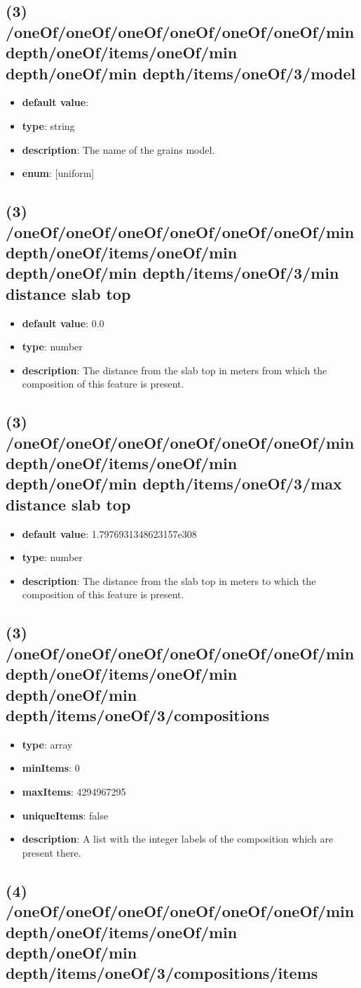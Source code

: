 \subsection{(3) /oneOf/oneOf/oneOf/oneOf/oneOf/oneOf/min depth/oneOf/items/oneOf/min depth/oneOf/min depth/items/oneOf/3/model}
\begin{itemize}[leftmargin=3em]\item {\bf default value}: 
\item {\bf type}: string
\item {\bf description}: The name of the grains model.
\item {\bf enum}: [uniform]\end{itemize}\subsection{(3) /oneOf/oneOf/oneOf/oneOf/oneOf/oneOf/min depth/oneOf/items/oneOf/min depth/oneOf/min depth/items/oneOf/3/min distance slab top}
\begin{itemize}[leftmargin=3em]\item {\bf default value}: 0.0
\item {\bf type}: number
\item {\bf description}: The distance from the slab top in meters from which the composition of this feature is present.
\end{itemize}\subsection{(3) /oneOf/oneOf/oneOf/oneOf/oneOf/oneOf/min depth/oneOf/items/oneOf/min depth/oneOf/min depth/items/oneOf/3/max distance slab top}
\begin{itemize}[leftmargin=3em]\item {\bf default value}: 1.7976931348623157e308
\item {\bf type}: number
\item {\bf description}: The distance from the slab top in meters to which the composition of this feature is present.
\end{itemize}\subsection{(3) /oneOf/oneOf/oneOf/oneOf/oneOf/oneOf/min depth/oneOf/items/oneOf/min depth/oneOf/min depth/items/oneOf/3/compositions}
\begin{itemize}[leftmargin=3em]\item {\bf type}: array
\item {\bf minItems}: 0
\item {\bf maxItems}: 4294967295
\item {\bf uniqueItems}: false
\item {\bf description}: A list with the integer labels of the composition which are present there.
\end{itemize}\subsection{(4) /oneOf/oneOf/oneOf/oneOf/oneOf/oneOf/min depth/oneOf/items/oneOf/min depth/oneOf/min depth/items/oneOf/3/compositions/items}
